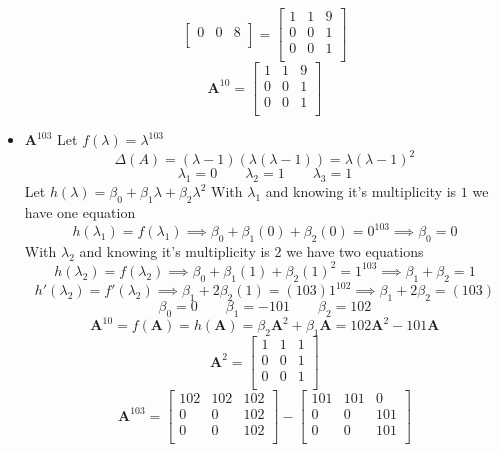 \documentclass{article}
\begin{document}
\begin{itemize}
$$\begin{bmatrix}
0 & 0 & 8 \\
\end{bmatrix}
=
\begin{bmatrix}
1 & 1 & 9 \\
0 & 0 & 1 \\
0 & 0 & 1 \\
\end{bmatrix}
$$
$$
\mathbf{A}^{10}
=
\begin{bmatrix}
1 & 1 & 9 \\
0 & 0 & 1 \\
0 & 0 & 1 \\
\end{bmatrix}
$$
\item $\mathbf{A}^{103}$
\newline
Let $f(\lambda) = \lambda^{103}$
$$\Delta(A) = (\lambda-1)(\lambda(\lambda-1)) = \lambda(\lambda-1)^2 $$
$$ \lambda_1 = 0 \qquad \lambda_2 = 1 \qquad \lambda_3 = 1 $$
Let $h(\lambda) = \beta_0 + \beta_1\lambda + \beta_2\lambda^2$
\newline
With $\lambda_1$ and knowing it's multiplicity is $1$ we have one equation
$$ h(\lambda_1) = f(\lambda_1) \implies \beta_0 + \beta_1(0) + \beta_2(0) = 0^{103} \implies \beta_0 = 0 $$
With $\lambda_2$ and knowing it's multiplicity is $2$ we have two equations
$$ h(\lambda_2) = f(\lambda_2) \implies \beta_0 + \beta_1(1) + \beta_2(1)^2 = 1^{103} \implies \beta_1 + \beta_2 = 1 $$
$$ h'(\lambda_2) = f'(\lambda_2) \implies \beta_1 + 2\beta_2(1) = (103)1^{102} \implies \beta_1 + 2\beta_2 = (103) $$
$$ \beta_0 = 0 \qquad \beta_1 = -101 \qquad \beta_2 = 102  $$
$$ \mathbf{A}^{10} = f(\mathbf{A}) = h(\mathbf{A}) = \beta_2\mathbf{A}^2 + \beta_1\mathbf{A} = 102\mathbf{A}^2 - 101\mathbf{A} $$
$$
\mathbf{A}^2
=
\begin{bmatrix}
1 & 1 & 1 \\
0 & 0 & 1 \\
0 & 0 & 1 \\
\end{bmatrix}
$$
$$
\mathbf{A}^{103}
=
\begin{bmatrix}
102 & 102 & 102 \\
0 & 0 & 102 \\
0 & 0 & 102 \\
\end{bmatrix}
-
\begin{bmatrix}
101 & 101 & 0 \\
0 & 0 & 101 \\
0 & 0 & 101 \\
\end{bmatrix}
$$
\end{itemize}
\end{document}
